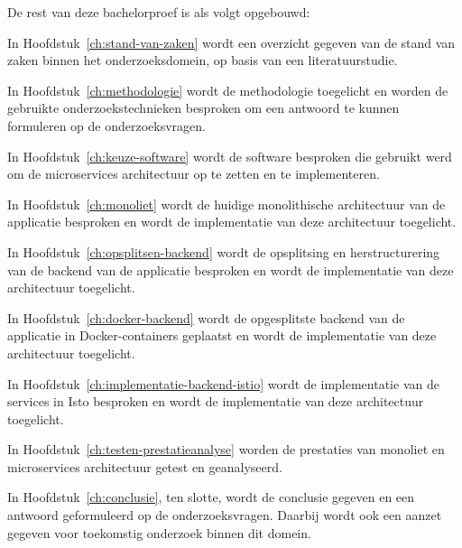 
De rest van deze bachelorproef is als volgt opgebouwd:

In Hoofdstuk~\ref{ch:stand-van-zaken} wordt een overzicht gegeven van de stand van zaken binnen het onderzoeksdomein, op basis van een literatuurstudie.

In Hoofdstuk~\ref{ch:methodologie} wordt de methodologie toegelicht en worden de gebruikte onderzoekstechnieken besproken om een antwoord te kunnen formuleren op de onderzoeksvragen.

In Hoofdstuk~\ref{ch:keuze-software} wordt de software besproken die gebruikt werd om de microservices architectuur op te zetten en te implementeren.

In Hoofdstuk~\ref{ch:monoliet} wordt de huidige monolithische architectuur van de applicatie besproken en wordt de implementatie van deze architectuur toegelicht.

In Hoofdstuk~\ref{ch:opsplitsen-backend} wordt de opsplitsing en herstructurering van de backend van de applicatie besproken en wordt de implementatie van deze architectuur toegelicht.

In Hoofdstuk~\ref{ch:docker-backend} wordt de opgesplitste backend van de applicatie in Docker-containers geplaatst en wordt de implementatie van deze architectuur toegelicht.

In Hoofdstuk~\ref{ch:implementatie-backend-istio} wordt de implementatie van de services in Isto besproken en wordt de implementatie van deze architectuur toegelicht.

In Hoofdstuk~\ref{ch:testen-prestatieanalyse} worden de prestaties van monoliet en microservices architectuur getest en geanalyseerd.


In Hoofdstuk~\ref{ch:conclusie}, ten slotte, wordt de conclusie gegeven en een antwoord geformuleerd op de onderzoeksvragen. Daarbij wordt ook een aanzet gegeven voor toekomstig onderzoek binnen dit domein.